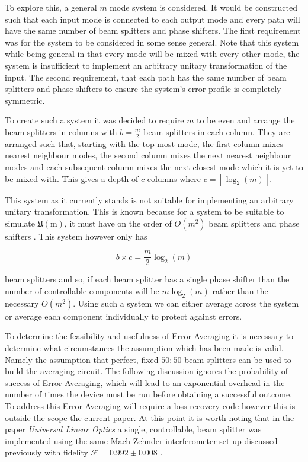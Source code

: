 \documentclass[aps,pra,twocolumn,superscriptaddress,numerical]{revtex4-1}
\begin{document}
		To explore this, a general $m$ mode system is considered. It would be constructed such that each input mode is connected to each output mode and every path will have the same number of beam splitters and phase shifters. The first requirement was for the system to be considered in some sense general. Note that this system while being general in that every mode will be mixed with every other mode, the system is insufficient to implement an arbitrary unitary transformation of the input. The second requirement, that each path has the same number of beam splitters and phase shifters to ensure the system's error profile is completely symmetric.  
				
		To create such a system it was decided to require $m$ to be even and arrange the beam splitters in columns with $b=\frac{m}{2}$ beam splitters in each column. They are arranged such that, starting with the top most mode, the first column mixes nearest neighbour modes, the second column mixes the next nearest neighbour modes and each subsequent column mixes the next closest mode which it is yet to be mixed with. This gives a depth of $c$ columns where $c=\left\lceil \log_{2}(m)\right\rceil $. 
		
		This system as it currently stands is not suitable for implementing an arbitrary unitary transformation. This is known because for a system to be suitable to simulate $\mathfrak{U\mathrm{(m)}}$, it must have on the order of $O\left(m^{2}\right)$ beam splitters and phase shifters \cite{reck}. This system however only has
		
		\begin{equation}
		b\times c=\frac{m}{2}\log_{2}(m)
		\end{equation}
		
		
		beam splitters and so, if each beam splitter has a single phase shifter than the number of controllable components will be $m\log_{2}(m)$ rather than the necessary $O\left(m^{2}\right)$. Using such a system we can either average across the system or average each component individually to protect against errors.
			
		To determine the feasibility and usefulness of Error Averaging it is necessary to determine what circumstances the assumption which has been made is valid. Namely the assumption that perfect, fixed $50:50$ beam splitters can be used to build the averaging circuit. The following discussion ignores the probability of success of Error Averaging, which will lead to an exponential overhead in the number of times the device must be run before obtaining a successful outcome. To address this Error Averaging will require a loss recovery code \cite{OQC} however this is outside the scope the current paper. At this point it is worth noting that in the paper  \textit{Universal Linear Optics} a single, controllable, beam splitter was implemented using the same Mach-Zehnder interferometer set-up discussed previously with fidelity $\mathcal{F}=0.992\pm0.008$ \cite{ULO}. 
		
\end{document}
